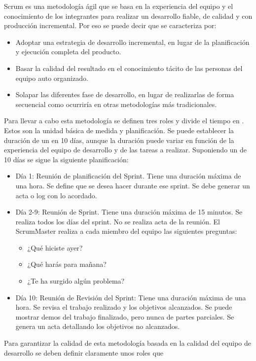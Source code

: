 Scrum es una metodología ágil que se basa en la experiencia del equipo
y el conocimiento de los integrantes para realizar un desarrollo
fiable, de calidad y con producción incremental. Por eso se puede
decir que se caracteriza por:
\begin{itemize}
\item Adoptar una estrategia de desarrollo incremental, en lugar de la
  planificación y ejecución completa del producto.
\item Basar la calidad del resultado en el conocimiento tácito de las
  personas del equipo auto organizado.
\item Solapar las diferentes fase de desarrollo, en lugar de
  realizarlas de forma secuencial como ocurriría en otras metodologías
  más tradicionales.
\end{itemize}
Para llevar a cabo esta metodología se definen tres roles y divide el
tiempo en . Estos  son la unidad básica de
medida y planificación. Se puede establecer la duración de un
 en 10 días, aunque la duración puede variar en función de
la experiencia del equipo de desarrollo y de las tareas a
realizar. Suponiendo un  de 10 días se sigue la siguiente
planificación:
\begin{itemize}
\item Día 1: Reunión de planificación del Sprint. Tiene una duración
  máxima de una hora. Se define que se desea hacer durante ese
  sprint. Se debe generar un acta o log con lo acordado.
\item Día 2-9: Reunión de Sprint. Tiene una duración máxima de 15
  minutos. Se realiza todos los días del sprint. No se realiza acta de
  la reunión. El ScrumMaster realiza a cada miembro del equipo las
  siguientes preguntas:
  \begin{itemize}
  \item ¿Qué hiciste ayer?
  \item ¿Qué harás para mañana?
  \item ¿Te ha surgido algún problema?
  \end{itemize}
\item Día 10: Reunión de Revisión del Sprint: Tiene una duración
  máxima de una hora. Se revisa el trabajo realizado y los objetivos
  alcanzados. Se puede mostrar demos del trabajo finalizado, pero
  nunca de partes parciales. Se genera un acta detallando los
  objetivos no alcanzados.  
\end{itemize}
Para garantizar la calidad de esta metodología basada en la calidad
del equipo de desarrollo se deben definir claramente unos roles que
